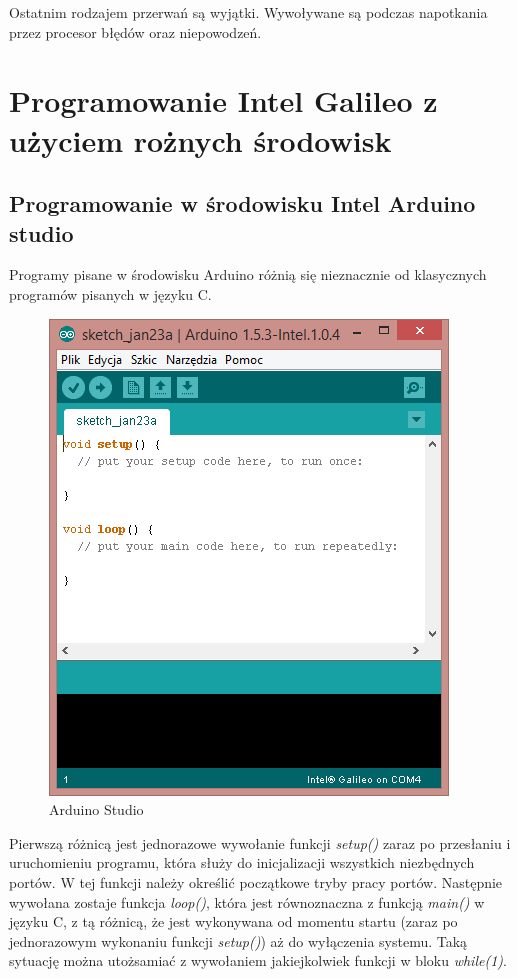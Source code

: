 \documentclass{xmgr}
\begin{document}
Ostatnim rodzajem przerwań są wyjątki. Wywoływane są podczas napotkania przez procesor błędów oraz niepowodzeń.

\chapter{Programowanie Intel Galileo z użyciem rożnych środowisk}
\section{Programowanie w środowisku Intel Arduino studio}
Programy pisane w środowisku Arduino różnią się nieznacznie od klasycznych programów pisanych w języku C. 

\begin{figure}[!h]
    \centering
    	\includegraphics[height=0.3\textheight]{images/AS.png}
    \caption{Arduino Studio}
\end{figure}

Pierwszą różnicą jest jednorazowe wywołanie funkcji \emph{setup()} zaraz po przesłaniu i uruchomieniu programu, która służy do inicjalizacji wszystkich niezbędnych portów. W tej funkcji należy określić początkowe tryby pracy portów. Następnie wywołana zostaje funkcja \emph{loop()}, która jest równoznaczna z funkcją \emph{main()} w języku C, z tą różnicą, że jest wykonywana od momentu startu (zaraz po jednorazowym wykonaniu funkcji \emph{setup()}) aż do wyłączenia systemu. Taką sytuację można utożsamiać z wywołaniem jakiejkolwiek funkcji w bloku \emph{while(1)}.
\end{document}
